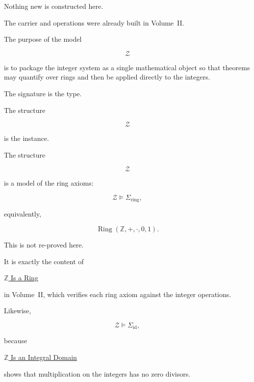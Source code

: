 \begin{remark*}[Interpretation]

Nothing new is constructed here.

The carrier and operations were already built in Volume~II.

The purpose of the model

\[
\mathcal Z
\]

is to package the integer system as a single mathematical object so that
theorems may quantify over rings and then be applied directly to the integers.

The signature is the type.

The structure

\[
\mathcal Z
\]

is the instance.

\end{remark*}


\begin{remark*}[Satisfaction]

The structure

\[
\mathcal Z
\]

is a model of the ring axioms:

\[
\mathcal Z
\models
\Sigma_{\mathrm{ring}},
\]

equivalently,

\[
\operatorname{Ring}
(\mathbb Z,+,\cdot,0,1).
\]

This is not re-proved here.

It is exactly the content of

\hyperref[thm:z-is-ring]{$\mathbb Z$ Is a Ring}

in Volume~II, which verifies each ring axiom against the integer operations.

Likewise,

\[
\mathcal Z
\models
\Sigma_{\mathrm{id}},
\]

because

\hyperref[thm:z-is-integral-domain]{$\mathbb Z$ Is an Integral Domain}

shows that multiplication on the integers has no zero divisors.

\end{remark*}


